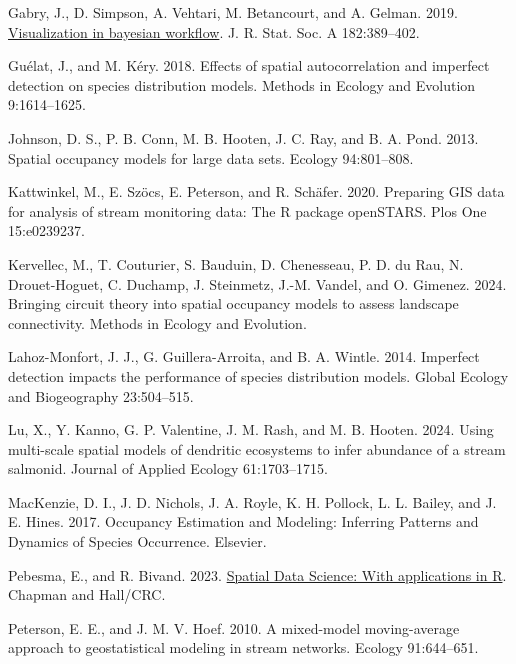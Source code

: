 \documentclass[
  11pt,
  a4paper,
]{article}
\newlength{\cslhangindent}
\newenvironment{CSLReferences}[2] %
 {\begin{list}{}{%
  \setlength{\itemindent}{0pt}
  \setlength{\leftmargin}{0pt}
  \setlength{\parsep}{0pt}
  \ifodd #1
   \setlength{\leftmargin}{\cslhangindent}
   \setlength{\itemindent}{-1\cslhangindent}
  \fi
  \setlength{\itemsep}{#2\baselineskip}}}
 {\end{list}}
\begin{document}
\begin{CSLReferences}{1}{0}
Gabry, J., D. Simpson, A. Vehtari, M. Betancourt, and A. Gelman. 2019. \href{https://doi.org/10.1111/rssa.12378}{Visualization in bayesian workflow}. J. R. Stat. Soc. A 182:389--402.

Guélat, J., and M. Kéry. 2018. Effects of spatial autocorrelation and imperfect detection on species distribution models. Methods in Ecology and Evolution 9:1614--1625.

Johnson, D. S., P. B. Conn, M. B. Hooten, J. C. Ray, and B. A. Pond. 2013. Spatial occupancy models for large data sets. Ecology 94:801--808.

Kattwinkel, M., E. Szöcs, E. Peterson, and R. Schäfer. 2020. Preparing GIS data for analysis of stream monitoring data: The {R} package openSTARS. Plos One 15:e0239237.

Kervellec, M., T. Couturier, S. Bauduin, D. Chenesseau, P. D. du Rau, N. Drouet-Hoguet, C. Duchamp, J. Steinmetz, J.-M. Vandel, and O. Gimenez. 2024. Bringing circuit theory into spatial occupancy models to assess landscape connectivity. Methods in Ecology and Evolution.

Lahoz-Monfort, J. J., G. Guillera-Arroita, and B. A. Wintle. 2014. Imperfect detection impacts the performance of species distribution models. Global Ecology and Biogeography 23:504--515.

Lu, X., Y. Kanno, G. P. Valentine, J. M. Rash, and M. B. Hooten. 2024. Using multi-scale spatial models of dendritic ecosystems to infer abundance of a stream salmonid. Journal of Applied Ecology 61:1703--1715.

MacKenzie, D. I., J. D. Nichols, J. A. Royle, K. H. Pollock, L. L. Bailey, and J. E. Hines. 2017. Occupancy {Estimation} and {Modeling}: {Inferring Patterns} and {Dynamics} of {Species Occurrence}. {Elsevier}.

Pebesma, E., and R. Bivand. 2023. \href{https://doi.org/10.1201/9780429459016}{{Spatial Data Science: With applications in R}}. {Chapman and Hall/CRC}.

Peterson, E. E., and J. M. V. Hoef. 2010. A mixed-model moving-average approach to geostatistical modeling in stream networks. Ecology 91:644--651.


\end{CSLReferences}
\end{document}
